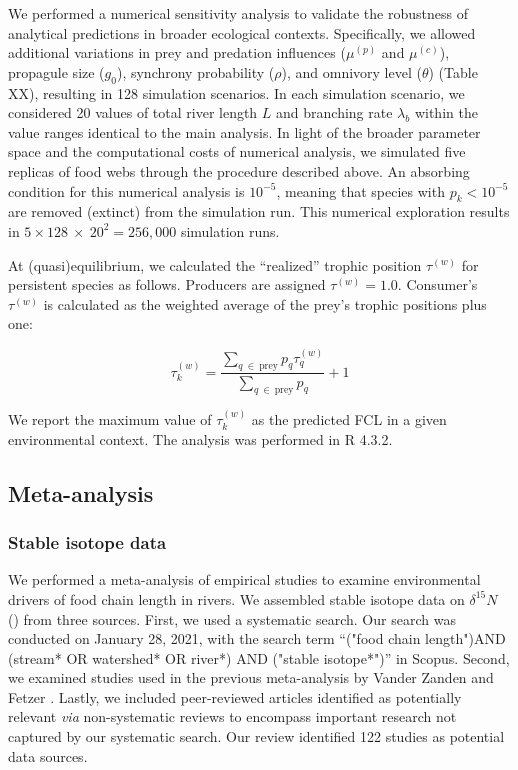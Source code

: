 \documentclass[11pt, class=article, crop=false]{standalone}
\begin{document}
We performed a numerical sensitivity analysis to validate the robustness of analytical predictions in broader ecological contexts.
Specifically, we allowed additional variations in prey and predation influences ($\mu^{(p)}$ and $\mu^{(c)}$), propagule size ($g_0$), synchrony probability ($\rho$), and omnivory level ($\theta$) (Table XX), resulting in 128 simulation scenarios.
In each simulation scenario, we considered 20 values of total river length $L$ and branching rate $\lambda_b$ within the value ranges identical to the main analysis.
In light of the broader parameter space and the computational costs of numerical analysis, we simulated five replicas of food webs through the procedure described above.
An absorbing condition for this numerical analysis is $10^{-5}$, meaning that species with $p_k < 10^{-5}$ are removed (extinct) from the simulation run.
This numerical exploration results in $5 \times 128~\times~20^2 = 256,000$ simulation runs.

At (quasi)equilibrium, we calculated the ``realized'' trophic position $\tau^{(w)}$ for persistent species as follows.
Producers are assigned $\tau^{(w)} = 1.0$.
Consumer's $\tau^{(w)}$ is calculated as the weighted average of the prey's trophic positions plus one:

\begin{equation}
    \tau^{(w)}_k = \frac{\sum_{q~\in~\text{prey}} p_{q} \tau^{(w)}_q}{\sum_{q~\in~\text{prey}} p_{q}} + 1
\end{equation}

We report the maximum value of $\tau_k^{(w)}$ as the predicted FCL in a given environmental context.
The analysis was performed in R 4.3.2.

\subsection{Meta-analysis}

\subsubsection{Stable isotope data}

We performed a meta-analysis of empirical studies to examine environmental drivers of food chain length in rivers.
We assembled stable isotope data on $\delta^{15} N$ (\textperthousand) from three sources.
First, we used a systematic search. 
Our search was conducted on January 28, 2021, with the search term ``("food chain length")AND (stream* OR watershed* OR river*) AND ("stable isotope*")'' in Scopus.
Second, we examined studies used in the previous meta-analysis by Vander Zanden and Fetzer \citep{vander_zanden_global_2007}.
Lastly, we included peer-reviewed articles identified as potentially relevant \textit{via} non-systematic reviews to encompass important research not captured by our systematic search.
Our review identified 122 studies as potential data sources.
\end{document}
